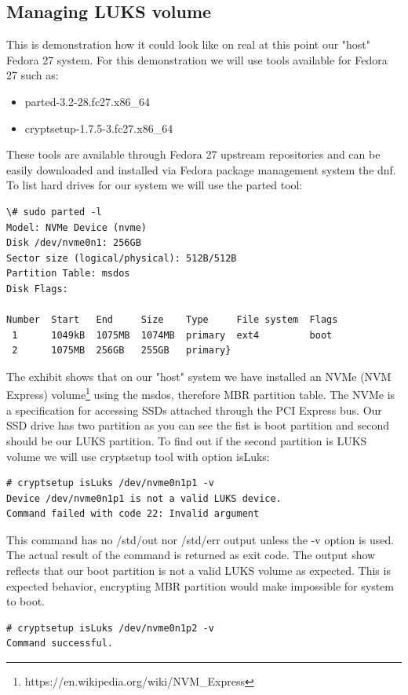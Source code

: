 \subsection{Managing LUKS volume}

This is demonstration how it could look like on real at this point our "host" Fedora 27 system.
For this demonstration we will use tools available for Fedora 27 such as:\\
\begin{itemize}
    \item parted-3.2-28.fc27.x86\_64
    \item cryptsetup-1.7.5-3.fc27.x86\_64
\end{itemize}
These tools are available through Fedora 27 upstream repositories and can be easily downloaded and installed via Fedora package management system the dnf.
To list hard drives for our system we will use the parted tool:
\begin{lstlisting}
\# sudo parted -l
Model: NVMe Device (nvme)
Disk /dev/nvme0n1: 256GB
Sector size (logical/physical): 512B/512B
Partition Table: msdos
Disk Flags:

Number  Start   End     Size    Type     File system  Flags
 1      1049kB  1075MB  1074MB  primary  ext4         boot
 2      1075MB  256GB   255GB   primary}
\end{lstlisting}
The exhibit shows that on our "host" system we have installed an NVMe (NVM Express) volume\footnote{https://en.wikipedia.org/wiki/NVM\_Express} using the msdos, therefore MBR partition table.
The NVMe is a specification for accessing SSDs attached through the PCI Express bus.
Our SSD drive has two partition as you can see the fist is boot partition and second should be our LUKS partition.
To find out if the second partition is LUKS volume we will use cryptsetup tool with option isLuks:
\begin{lstlisting}
# cryptsetup isLuks /dev/nvme0n1p1 -v
Device /dev/nvme0n1p1 is not a valid LUKS device.
Command failed with code 22: Invalid argument
\end{lstlisting}
This command has no /std/out nor /std/err output unless the -v option is used.
The actual result of the command is returned as exit code.
The output show reflects that our boot partition is not a valid LUKS volume as expected.
This is expected behavior, encrypting MBR partition would make impossible for system to boot.
\begin{lstlisting}
# cryptsetup isLuks /dev/nvme0n1p2 -v
Command successful.
\end{lstlisting}
